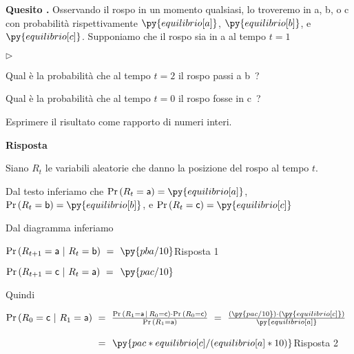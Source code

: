 \documentclass[11pt,twoside,a4paper]{article}
\newcommand{\mylabel}[1]{#1\hfill}
\renewenvironment{itemize}
  {\begin{list}{$\triangleright$}{%
   \setlength{\parskip}{0mm}
   \setlength{\topsep}{.4\baselineskip}
   \setlength{\rightmargin}{0mm}
   \setlength{\listparindent}{0mm}
   \setlength{\itemindent}{0mm}
   \setlength{\labelwidth}{2ex}
   \setlength{\itemsep}{.4\baselineskip}
   \setlength{\parsep}{0mm}
   \setlength{\partopsep}{0mm}
   \setlength{\labelsep}{1ex}
   \setlength{\leftmargin}{\labelwidth+\labelsep}
   \let\makelabel\mylabel}}{%
   \end{list}\vspace*{-1.3mm}}
\def\Pr{{\rm Pr\,}}
\newcounter{quesito}
\newenvironment{question}{\bigskip\addtocounter{quesito}{1}\par\textbf{Quesito \thequesito.}}{\vspace{\parskip}}
\newenvironment{answer}{\par\textbf{Risposta\quad}}{\vspace{\parskip}}
\begin{document}
\begin{question}
Osservando il rospo in un momento qualsiasi, lo troveremo in {\sf a}, {\sf b}, o {\sf c} con probabilità rispettivamente $\py{equilibrio[a]}$, $\py{equilibrio[b]}$, e $\py{equilibrio[c]}$. Supponiamo che il rospo sia in {\sf a} al tempo $t=1$ 

\begin{itemize}
\item[1.] Qual è la probabilità che al tempo $t=2$ il rospo passi a {\sf b}~?

\item[2.] Qual è la probabilità che al tempo $t=0$ il rospo fosse in {\sf c}~?
\end{itemize}

Esprimere il risultato come rapporto di numeri interi.

\begin{answer}

Siano $R_t$ le variabili aleatorie che danno la posizione del rospo al tempo $t$.

Dal testo inferiamo che $\Pr(R_t={\sf a})=\py{equilibrio[a]}$, $\Pr(R_t={\sf b})=\py{equilibrio[b]}$, e $\Pr(R_t={\sf c})=\py{equilibrio[c]}$

Dal diagramma inferiamo 

$\Pr(R_{t+1}={\sf a}~|~R_t={\sf b})\ =\kern1.2ex${\color{blue}$\py{pba/10}$\hfill Risposta 1}

$\Pr(R_{t+1}={\sf c}~|~R_t={\sf a})\ =\kern1ex\py{pac/10}$

Quindi

$\Pr(R_0={\sf c}~|~R_1={\sf a})
\ =\ \frac{\Pr(R_1={\sf a}\,|\,R_0={\sf c})\cdot\Pr(R_0={\sf c})}{\Pr(R_1={\sf a})}
\ =\ \frac{(\py{pac/10})\cdot(\py{equilibrio[c]})}{\py{equilibrio[a]}}$

$\phantom{\Pr(R_0={\sf c}~|~R_1={\sf a})}
\ =\kern1.2ex${\color{blue}$\py{pac*equilibrio[c]/(equilibrio[a]*10)}$\hfill Risposta 2}

\end{answer}



\end{question}
\end{document}
